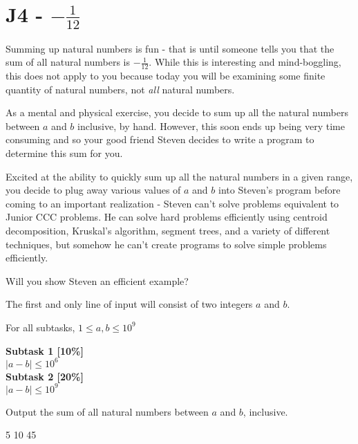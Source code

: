\section*{J4 - $-\frac{1}{12}$}
Summing up natural numbers is fun - that is until someone tells you that the sum of all natural numbers is $−\frac{1}{12}$. While this is interesting and mind-boggling, this does not apply to you because today you will be examining some finite quantity of natural numbers, not \textit{all} natural numbers.

As a mental and physical exercise, you decide to sum up all the natural numbers between $a$ and $b$ inclusive, by hand. However, this soon ends up being very time consuming and so your good friend Steven decides to write a program to determine this sum for you.

Excited at the ability to quickly sum up all the natural numbers in a given range, you decide to plug away various values of $a$ and $b$ into Steven's program before coming to an important realization - Steven can't solve problems equivalent to Junior CCC problems. He can solve hard problems efficiently using centroid decomposition, Kruskal's algorithm, segment trees, and a variety of different techniques, but somehow he can't create programs to solve simple problems efficiently.

Will you show Steven an efficient example?

The first and only line of input will consist of two integers $a$ and $b$.

\constraints
For all subtasks, $1 \leq a, b \leq 10^9$

\textbf{Subtask 1 [10\%]} \\
$|a - b| \leq 10^6$ \\

\textbf{Subtask 2 [20\%]} \\
$|a - b| \leq 10^9$

\outputformat
Output the sum of all natural numbers between $a$ and $b$, inclusive.

\addsample
{
    5 10
}
{
    45
}